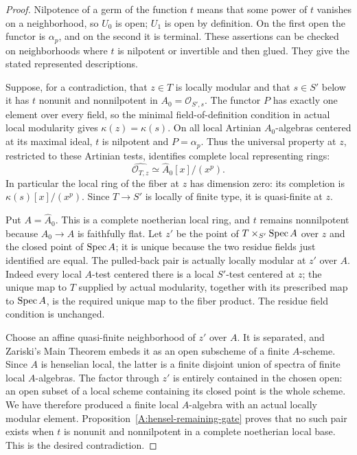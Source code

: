 \begin{proof}
Nilpotence of a germ of the function $t$ means that some power of
$t$ vanishes on a neighborhood, so $U_0$ is open; $U_1$ is open
by definition.  On the first open the functor is $\alpha_p$, and
on the second it is terminal.  These assertions can be checked
on neighborhoods where $t$ is nilpotent or invertible and then
glued.  They give the stated represented descriptions.

Suppose, for a contradiction, that $z\in T$ is locally modular
and that $s\in S'$ below it has $t$ nonunit and nonnilpotent in
$A_0=\mathcal O_{S',s}$.  The functor $P$ has exactly one element
over every field, so the minimal field-of-definition condition
in actual local modularity gives $\kappa(z)=\kappa(s)$.
On all local Artinian $A_0$-algebras centered at its maximal ideal,
$t$ is nilpotent and $P=\alpha_p$.  Thus the universal property
at $z$, restricted to these Artinian tests, identifies complete
local representing rings:
\[
 \widehat{\mathcal O_{T,z}}
       \simeq \widehat A_0[x]/(x^p).
\]
In particular the local ring of the fiber at $z$ has dimension
zero: its completion is $\kappa(s)[x]/(x^p)$.
Since $T\to S'$ is locally of finite type, it is quasi-finite
at $z$.

Put $A=\widehat A_0$.  This is a complete noetherian local ring,
and $t$ remains nonnilpotent because $A_0\to A$ is faithfully
flat.  Let $z'$ be the point of $T\times_{S'}\operatorname{Spec} A$ over
$z$ and the closed point of $\operatorname{Spec} A$; it is unique because the
two residue fields just identified are equal.
The pulled-back pair is actually locally modular at $z'$ over
$A$.  Indeed every local $A$-test centered there is a local
$S'$-test centered at $z$; the unique map to $T$ supplied by
actual modularity, together with its prescribed map to $\operatorname{Spec} A$,
is the required unique map to the fiber product.  The residue
field condition is unchanged.

Choose an affine quasi-finite neighborhood of $z'$ over $A$.
It is separated, and Zariski's Main Theorem embeds it as an open
subscheme of a finite $A$-scheme.  Since $A$ is henselian local,
the latter is a finite disjoint union of spectra of finite local
$A$-algebras.  The factor through $z'$ is entirely contained in
the chosen open: an open subset of a local scheme containing its
closed point is the whole scheme.  We have therefore produced
a finite local $A$-algebra with an actual locally modular
element.  Proposition~\ref{A:hensel-remaining-gate} proves that no
such pair exists when $t$ is nonunit and nonnilpotent in a complete
noetherian local base.  This is the desired contradiction.


\end{proof}
